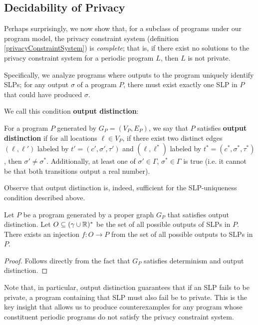 \subsection{Decidability of Privacy}

Perhaps surprisingly, we now show that, for a subclass of programs under our program model, the privacy constraint system (definition \ref{privacyConstraintSystem}) is \textit{complete}; that is, if there exist no solutions to the privacy constraint system for a periodic program $L$, then $L$ is not private. 

Specifically, we analyze programs where outputs to the program uniquely identify SLPs; for any output $\sigma$ of a program $P$, there must exist exactly one SLP in $P$ that could have produced $\sigma$. 

We call this condition \textbf{output distinction}:

\begin{defn}\label{outputDistinctionDef}
    For a program $P$ generated by $G_P = (V_P, E_P)$, we say that $P$ satisfies \textbf{output distinction} if for all locations $\ell\in V_P$, if there exist two distinct edges $(\ell, \ell')$ labeled by $t'=(c', \sigma', \tau')$ and $(\ell, \ell^*)$ labeled by $t^* = (c^*, \sigma^*, \tau^*)$, then $\sigma' \neq \sigma^*$. Additionally, at least one of $\sigma'\in \Gamma$, $\sigma^*\in \Gamma$ is true (i.e. it cannot be that both transitions output a real number).
\end{defn}

Observe that output distinction is, indeed, sufficient for the SLP-uniqueness condition described above.

\begin{prop}
    Let $P$ be a program generated by a proper graph $G_P$ that satisfies output distinction. Let $O\subseteq (\gamma\cup \mathbb{R})^*$ be the set of all possible outputs of SLPs in $P$. There exists an injection $f: O\to P$ from the set of all possible outputs to SLPs in $P$. 
\end{prop}
\begin{proof}
    Follows directly from the fact that $G_P$ satisfies determinism and output distinction. 
\end{proof}

Note that, in particular, output distinction guarantees that if an SLP fails to be private, a program containing that SLP must also fail be to private. This is the key insight that allows us to produce counterexamples for any program whose constituent periodic programs do not satisfy the privacy constraint system. 

